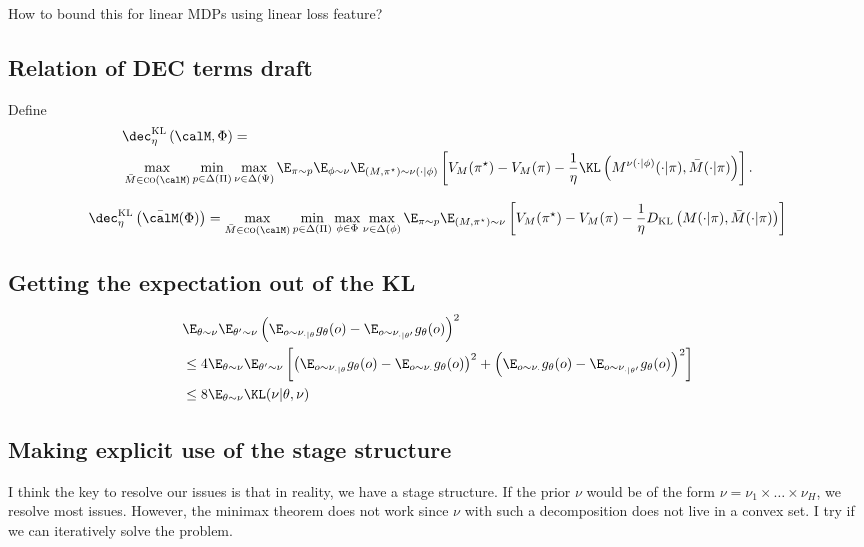 How to bound this for linear MDPs using linear loss feature?

\subsection{Relation of DEC terms draft}
Define \begin{align*}
&\dec_{\eta}^{\textsc{KL}}\left(\calM, \Phi\right) = 
\\&\max_{\Bar{M} \in \textsc{co}(\calM)}\min_{p\in\Delta(\Pi)} \max_{\nu\in \Delta(\Psi)}   \E_{\pi\sim p} \E_{\phi\sim \nu}  \E_{(M,\pi^\star)\sim \nu(\cdot|\phi)} \left[V_{M}(\pi^\star) - V_{M}(\pi) - \frac{1}{\eta}  \KL\left( M^{\nu(\cdot|\phi)}(\cdot|\pi), \Bar{M}(\cdot|\pi) \right)\right]. 
\end{align*}

 \begin{align*}
\dec_{\eta}^{\textsc{KL}}\left(\bar\calM(\Phi)\right) = \max_{\Bar{M} \in \textsc{co}(\calM)} \min_{p \in \Delta(\Pi)}\max_{\phi\in\Phi}\max_{\nu \in \Delta(\phi)} \E_{\pi \sim p}\E_{(M,\pi^\star) \sim \nu}\left[V_M(\pi^\star) - V_M(\pi) - \frac{1}{\eta}D_{\textsc{KL}}\left(M(\cdot|\pi), \Bar{M}(\cdot|\pi)\right)\right]
\end{align*}
\subsection{Getting the expectation out of the KL}


\begin{align*}
    &\E_{\theta\sim\nu}\E_{\theta'\sim\nu}\left( \E_{o\sim \nu_{\cdot|\theta}}g_\theta(o)-\E_{o\sim \nu_{\cdot|\theta'}}g_\theta(o)\right)^2\\
    &\leq 4\E_{\theta\sim\nu}\E_{\theta'\sim\nu}\left[\left( \E_{o\sim \nu_{\cdot|\theta}}g_\theta(o)-\E_{o\sim \nu_{\cdot}}g_\theta(o)\right)^2+\left( \E_{o\sim \nu_{\cdot}}g_\theta(o)-\E_{o\sim \nu_{\cdot|\theta'}}g_\theta(o)\right)^2\right]\\
    &\leq 8\E_{\theta\sim\nu}\KL(\nu|\theta,\nu)
\end{align*}


\subsection{Making explicit use of the stage structure}
I think the key to resolve our issues is that in reality, we have a stage structure. If the prior $\nu$ would be of the form $\nu=\nu_1\times\dots\times\nu_H$, we resolve most issues. However, the minimax theorem does not work since $\nu$ with such a decomposition does not live in a convex set. I try if we can iteratively solve the problem.

